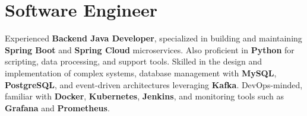 \section{Software Engineer}
\small{
  Experienced \textbf{Backend Java Developer}, 
  specialized in building and maintaining \textbf{Spring Boot} and \textbf{Spring Cloud} microservices. Also proficient in \textbf{Python} for scripting, 
  data processing, and support tools. 
  Skilled in the design and implementation of complex systems, database management with \textbf{MySQL}, \textbf{PostgreSQL}, and event-driven architectures leveraging \textbf{Kafka}. 
  DevOps-minded, familiar with \textbf{Docker}, \textbf{Kubernetes}, \textbf{Jenkins}, and monitoring tools such as \textbf{Grafana} and \textbf{Prometheus}.
}
